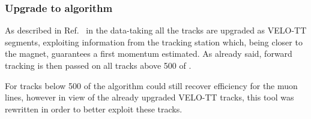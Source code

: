 \subsubsection{Upgrade to \mvTTm algorithm}
\label{sec:matchvelottmuon}

As described in Ref.~\cite{LHCb-PUB-2015-005} in the \runtwo data-taking all the tracks are upgraded as VELO-TT segments,
exploiting information from the \ttracker tracking station which, being closer to the magnet,
guarantees a first momentum estimated. As already said, forward tracking is then passed on
all tracks above 500 \mevc of \pt.

For tracks below 500 \mevc of \pt the \mvm algorithm could still recover efficiency for the muon lines,
however in view of the already upgraded VELO-TT tracks, this tool was rewritten in order to better exploit these tracks.

